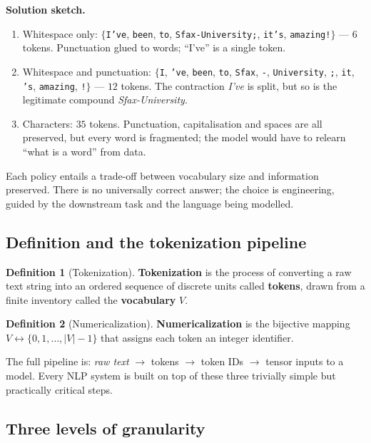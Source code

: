 \documentclass[12pt,a4paper]{report}
\theoremstyle{definition}
\newtheorem{definition}{Definition}[section]
\theoremstyle{remark}
\begin{document}
\textbf{Solution sketch.}
\begin{enumerate}
    \item Whitespace only: $\{$\texttt{I've}, \texttt{been}, \texttt{to}, \texttt{Sfax-University;}, \texttt{it's}, \texttt{amazing!}$\}$ --- $6$ tokens. Punctuation glued to words; ``I've'' is a single token.
    \item Whitespace and punctuation: $\{$\texttt{I}, \texttt{'ve}, \texttt{been}, \texttt{to}, \texttt{Sfax}, \texttt{-}, \texttt{University}, \texttt{;}, \texttt{it}, \texttt{'s}, \texttt{amazing}, \texttt{!}$\}$ --- $12$ tokens. The contraction \emph{I've} is split, but so is the legitimate compound \emph{Sfax-University}.
    \item Characters: $35$ tokens. Punctuation, capitalisation and spaces are all preserved, but every word is fragmented; the model would have to relearn ``what is a word'' from data.
\end{enumerate}
Each policy entails a trade-off between vocabulary size and information preserved. There is no universally correct answer; the choice is engineering, guided by the downstream task and the language being modelled.

\subsection{Definition and the tokenization pipeline}

\begin{definition}[Tokenization]
\textbf{Tokenization} is the process of converting a raw text string into an ordered sequence of discrete units called \textbf{tokens}, drawn from a finite inventory called the \textbf{vocabulary} $V$.
\end{definition}

\begin{definition}[Numericalization]
\textbf{Numericalization} is the bijective mapping $V \leftrightarrow \{0, 1, \dots, |V|-1\}$ that assigns each token an integer identifier.
\end{definition}

The full pipeline is: \emph{raw text} $\to$ tokens $\to$ token IDs $\to$ tensor inputs to a model. Every NLP system is built on top of these three trivially simple but practically critical steps.

\subsection{Three levels of granularity}
\end{document}
